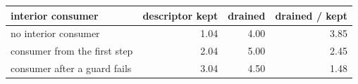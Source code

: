 \begin{tabular}{lrrr}
\toprule
interior consumer & descriptor kept & drained & drained / kept \\
\midrule
no interior consumer & 1.04 & 4.00 & 3.85 \\
consumer from the first step & 2.04 & 5.00 & 2.45 \\
consumer after a guard fails & 3.04 & 4.50 & 1.48 \\
\bottomrule
\end{tabular}
